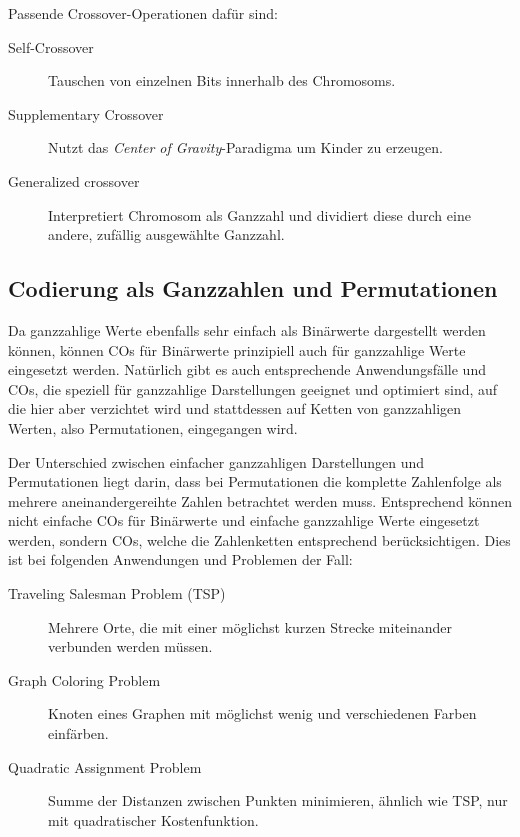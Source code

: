 	Passende Crossover-Operationen dafür sind:
	\begin{description}
		\item[Self-Crossover] Tauschen von einzelnen Bits innerhalb des Chromosoms. \cite{SelfCrossover}
		\item[Supplementary Crossover] Nutzt das \textit{Center of Gravity}-Paradigma um Kin\-der zu erzeugen. \cite{SupplementaryCrossover}
		\item[Generalized crossover] Interpretiert Chromosom als Ganzzahl und dividiert diese durch eine andere, zufällig ausgewählte Ganzzahl. \cite{GeneralizedCrossover}
	\end{description}

\subsection{Codierung als Ganzzahlen und Permutationen}
\label{sec:IntCod}

	Da ganzzahlige Werte ebenfalls sehr einfach als Binärwerte dargestellt werden können, können COs für Binärwerte prinzipiell auch für ganzzahlige Werte eingesetzt werden. Natürlich gibt es auch entsprechende Anwendungsfälle und COs, die speziell für ganzzahlige Darstellungen geeignet und optimiert sind, auf die hier aber verzichtet wird und stattdessen auf Ketten von ganzzahligen Werten, also Permutationen, eingegangen wird.
	
	Der Unterschied zwischen einfacher ganzzahligen Darstellungen und Permutationen liegt darin, dass bei Permutationen die komplette Zahlenfolge als mehrere aneinandergereihte Zahlen betrachtet werden muss. Entsprechend kön\-nen nicht einfache COs für Binärwerte und einfache ganzzahlige Werte eingesetzt werden, sondern COs, welche die Zahlenketten entsprechend berücksichtigen. Dies ist \uA bei folgenden Anwendungen und Problemen der Fall:
	\begin{description}
		\item[Traveling Salesman Problem (TSP)] Mehrere Orte, die mit einer möglichst kurzen Strecke miteinander verbunden werden müssen. \cite{GAforTSP}
		\item[Graph Coloring Problem] Knoten eines Graphen mit möglichst wenig und verschiedenen Farben einfärben. \cite{OrderBasedForGCP}
		\item[Quadratic Assignment Problem] Summe der Distanzen zwischen Punkten minimieren, ähnlich wie TSP, nur mit quadratischer Kostenfunktion. \cite{COforQAP}
	\end{description}
	
